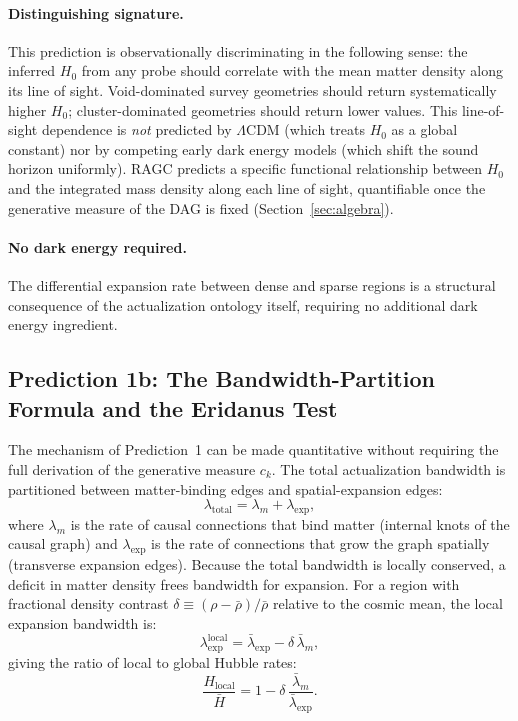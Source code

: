 \documentclass[11pt,a4paper]{article}
\theoremstyle{plain}
\theoremstyle{definition}
\theoremstyle{remark}
\begin{document}
\paragraph{Distinguishing signature.}
This prediction is observationally discriminating in the following sense: the
inferred $H_0$ from any probe should correlate with the mean matter density along
its line of sight. Void-dominated survey geometries should return systematically
higher $H_0$; cluster-dominated geometries should return lower values. This
line-of-sight dependence is \emph{not} predicted by $\Lambda$CDM (which treats
$H_0$ as a global constant) nor by competing early dark energy models (which shift
the sound horizon uniformly). RAGC predicts a specific functional relationship
between $H_0$ and the integrated mass density along each line of sight,
quantifiable once the generative measure of the DAG is fixed (Section~\ref{sec:algebra}).

\paragraph{No dark energy required.}
The differential expansion rate between dense and sparse regions is a structural
consequence of the actualization ontology itself, requiring no additional dark
energy ingredient.

\subsection{Prediction 1b: The Bandwidth-Partition Formula and the Eridanus Test}
\label{sec:hubble_partition}

The mechanism of Prediction~1 can be made quantitative without requiring the
full derivation of the generative measure $c_k$. The total actualization
bandwidth is partitioned between matter-binding edges and spatial-expansion
edges:
\begin{equation}
  \lambda_{\mathrm{total}} = \lambda_m + \lambda_{\mathrm{exp}},
  \label{eq:bandwidth_partition}
\end{equation}
where $\lambda_m$ is the rate of causal connections that bind matter
(internal knots of the causal graph) and $\lambda_{\mathrm{exp}}$ is the
rate of connections that grow the graph spatially (transverse expansion edges).
Because the total bandwidth is locally conserved, a deficit in matter density
frees bandwidth for expansion. For a region with fractional density contrast
$\delta \equiv (\rho - \bar\rho)/\bar\rho$ relative to the cosmic mean, the
local expansion bandwidth is:
\begin{equation}
  \lambda_{\mathrm{exp}}^{\mathrm{local}}
  = \bar\lambda_{\mathrm{exp}} - \delta\,\bar\lambda_m,
\end{equation}
giving the ratio of local to global Hubble rates:
\begin{equation}
  \frac{H_{\mathrm{local}}}{\bar H}
  = 1 - \delta\,\frac{\bar\lambda_m}{\bar\lambda_{\mathrm{exp}}}.
  \label{eq:hubble_partition_full}
\end{equation}
\end{document}
